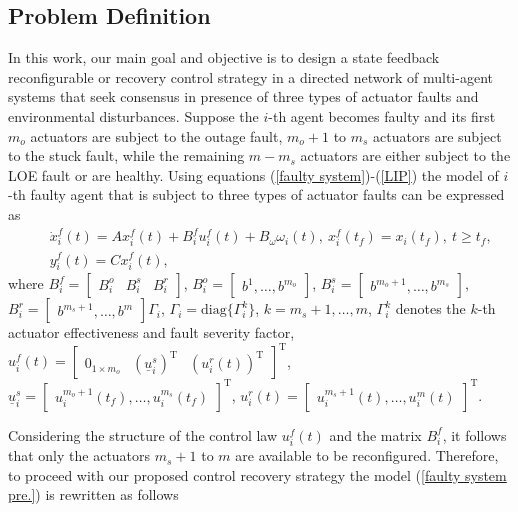 \documentclass[12pt,draftcls,onecolumn]{IEEEtran}
\begin{document}
\subsection{Problem Definition}\label{subsection 2-E}
 In this work, our main goal and objective is to design a state feedback reconfigurable  or recovery control strategy in a directed network of multi-agent systems that seek consensus in presence of three types of actuator faults and environmental disturbances. 
 Suppose the $i$-th agent becomes faulty and its first $m_{o}$ actuators are subject to the outage fault, $m_{o}+1$ to $m_{s}$ actuators are subject to the stuck fault, while the remaining $m-m_{s}$ actuators are either subject to the LOE fault or are healthy. Using equations (\ref{faulty system})-(\ref{LIP}) the model of $i$-th faulty agent that is subject to three types of actuator faults can be expressed as
\begin{eqnarray}
&&\dot x_i^f(t)=A x_i^f(t)+B_i^{f} u_i^f(t)+B_{\omega}\omega_i(t),\ x_i^f(t_f)=x_i(t_f),\  t\geq t_f,\label{faulty system pre.}\\ 
&&y_i^f(t)=Cx_i^f(t),\nonumber
\end{eqnarray} 
where  
$B_i^{f}=\begin{bmatrix}B_i^o&B_{i}^s&B_i^r\end{bmatrix}$, $B_{i}^o=\begin{bmatrix}b^{1},\dots,b^{m_{o}}\end{bmatrix}$, $B_{i}^s=\begin{bmatrix}b^{m_{o}+1},\dots,b^{m_{s}}\end{bmatrix}$, 
$B_{i}^r=\begin{bmatrix}b^{m_{s}+1},\dots,b^{m}\end{bmatrix}\Gamma_i$,  $\Gamma_i=\text{diag}\{\Gamma_i^k\}$, $k=m_{s}+1,\dots,{m}$, $\Gamma_i^{k}$ denotes the $k$-th actuator effectiveness and fault severity factor, $u_i^f(t)=\begin{bmatrix}0_{1\times m_o}&(\underline u_i^{s})^\text{T}&(u_i^r(t))^\text{T}\end{bmatrix}^\text{T}$, $\underline u_i^s=\begin{bmatrix}u_i^{m_{o}+1}(t_f),\dots,u_i^{m_{s}}(t_f)\end{bmatrix}^{\text{T}}$, $u_i^r(t)=\begin{bmatrix} u_i^{m_{s}+1}(t),\dots,u_i^{m}(t)\end{bmatrix}^{\text{T}}$. \par
Considering the structure of the control law $u_i^f(t)$ and the matrix $B_i^{f}$, it follows that only  the actuators $m_s+1$ to $m$ are available to be reconfigured. Therefore, to proceed with our proposed control recovery strategy the model (\ref{faulty system pre.}) is rewritten as follows 
\end{document}

